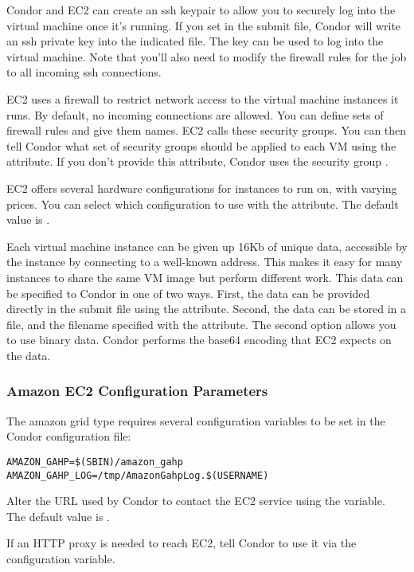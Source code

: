 Condor and EC2 can create an ssh keypair to allow you to securely log
into the virtual machine once it's running. If you set
 in the submit file, Condor will write
an ssh private key into the indicated file. The key can be used to log
into the virtual machine. Note that you'll also need to modify the firewall
rules for the job to all incoming ssh connections.

EC2 uses a firewall to restrict network access to the virtual machine
instances it runs. By default, no incoming connections are allowed.
You can define sets of firewall rules and give them names. EC2 calls
these security groups. You can then tell Condor what set of security
groups should be applied to each VM using the
 attribute. If you don't provide
this attribute, Condor uses the security group .

EC2 offers several hardware configurations for instances to run on, with
varying prices. You can select which configuration to use with the
 attribute. The default value is
.

Each virtual machine instance can be given up 16Kb of unique data, 
accessible by the instance by connecting to a well-known address. This
makes it easy for many instances to share the same VM image but perform
different work. This data can be specified to Condor in one of two ways.
First, the data can be provided directly in the submit file using the
 attribute. Second, the data can be
stored in a file, and the filename specified with the
 attribute. The second option allows
you to use binary data. Condor performs the base64 encoding that EC2
expects on the data.

\subsubsection{\label{sec:Amazon-config}Amazon EC2 Configuration Parameters}

The amazon grid type requires several configuration variables 
to be set in the Condor configuration file:

\footnotesize
\begin{verbatim}
AMAZON_GAHP=$(SBIN)/amazon_gahp
AMAZON_GAHP_LOG=/tmp/AmazonGahpLog.$(USERNAME)
\end{verbatim}
\normalsize

Alter the URL used by Condor to contact the EC2 service using
the  variable. The default value is
.

If an HTTP proxy is needed to reach EC2, tell Condor to use it
via the  configuration variable.
